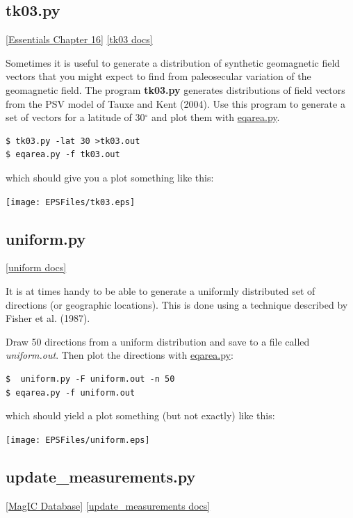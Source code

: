 \documentclass[11pt]{book}
\begin{document}
{{{

\subsection{tk03.py}
\href{http://earthref.org/MAGIC/books/Tauxe/Essentials/WebBook3ch16.html/#ch16}{[Essentials Chapter 16]}
\href{https://github.com/PmagPy/PmagPy/blob/master/programs/tk03.py}{[tk03 docs]}

Sometimes it is useful to generate a distribution of synthetic geomagnetic field vectors that you might expect to find from paleosecular variation of the geomagnetic field.  The program {\bf tk03.py} generates distributions of field vectors from the PSV model of Tauxe and Kent (2004).  \nocite{tauxe04}    Use this program to generate a set of vectors  for a latitude of 30$^{\circ}$ and plot them with \href{#eqarea.py}{eqarea.py}.

\begin{verbatim}
$ tk03.py -lat 30 >tk03.out
$ eqarea.py -f tk03.out
\end{verbatim}

which should give you a plot something like this:

\texttt{[image: EPSFiles/tk03.eps]}


\subsection{uniform.py}
\href{https://github.com/PmagPy/PmagPy/blob/master/programs/uniform.py}{[uniform docs]}

It is at times handy to be able to generate a uniformly distributed set of directions (or geographic locations).  This is done using a technique described by Fisher et al. (1987).

Draw 50 directions from a uniform distribution and save to a file called {\it uniform.out}.  Then plot the directions with \href{#eqarea.py}{eqarea.py}:

\begin{verbatim}
$  uniform.py -F uniform.out -n 50
$ eqarea.py -f uniform.out
\end{verbatim}

which should yield a plot something (but not exactly) like this:

\texttt{[image: EPSFiles/uniform.eps]}



\subsection{update\_measurements.py}
\href{#MagICDatabase}{[MagIC Database]}
\href{https://github.com/PmagPy/PmagPy/blob/master/programs/update_measurements.py}{[update\_measurements docs]}

}}}
\end{document}
